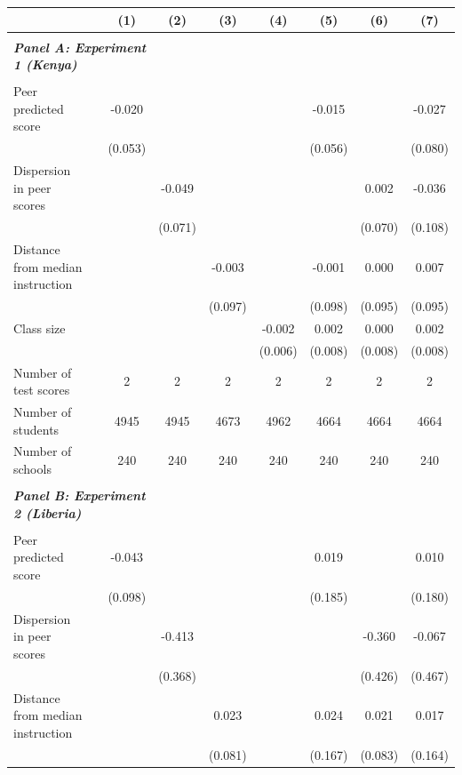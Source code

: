 \begin{center} 
\caption{\small Effect on test scores} 
\label{tab:descriptives} 
\begin{scriptsize}
\begin{threeparttable}
\begin{tabular} {@{} l l c c c c c c c  @{}} \toprule \toprule
& &(1)&(2)&(3)&(4)&(5)&(6)&(7) \\ \midrule 
\\
\multicolumn{3}{l}{\textbf{\textit{Panel A: Experiment 1 (Kenya)}}} \\
\\
Peer predicted score &  & -0.020 &  &  &  & -0.015 &  & -0.027 \\
                 &  & (0.053) &  &  &  & (0.056) &  & (0.080) \\
Dispersion in peer scores &  &  & -0.049 &  &  &  & 0.002 & -0.036 \\
                 &  &  & (0.071) &  &  &  & (0.070) & (0.108) \\
Distance from median instruction &  &  &  & -0.003 &  & -0.001 & 0.000 & 0.007 \\
                 &  &  &  & (0.097) &  & (0.098) & (0.095) & (0.095) \\
Class size &  &  &  &  & -0.002 & 0.002 & 0.000 & 0.002 \\
                 &  &  &  &  & (0.006) & (0.008) & (0.008) & (0.008) \\
\midrule
Number of test scores &  & 2 & 2 & 2 & 2 & 2 & 2 & 2 \\
Number of students &  & 4945 & 4945 & 4673 & 4962 & 4664 & 4664 & 4664 \\
Number of schools &  & 240 & 240 & 240 & 240 & 240 & 240 & 240 \\
 \midrule
\\
\multicolumn{3}{l}{\textbf{\textit{Panel B: Experiment 2 (Liberia)}}} \\
\\
Peer predicted score &  & -0.043 &  &  &  & 0.019 &  & 0.010 \\
                 &  & (0.098) &  &  &  & (0.185) &  & (0.180) \\
Dispersion in peer scores &  &  & -0.413 &  &  &  & -0.360 & -0.067 \\
                 &  &  & (0.368) &  &  &  & (0.426) & (0.467) \\
Distance from median instruction &  &  &  & 0.023 &  & 0.024 & 0.021 & 0.017 \\
                 &  &  &  & (0.081) &  & (0.167) & (0.083) & (0.164) \\

\end{tabular}
\end{threeparttable}
\end{scriptsize}
\end{center}
